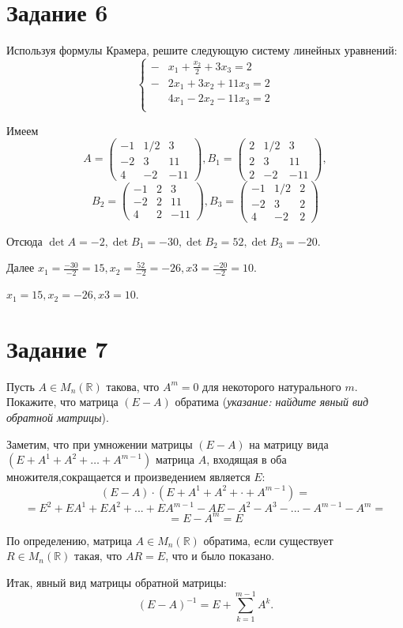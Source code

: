 \documentclass[a4paper,12pt]{article}
\begin{document}
\section*{Задание 6}
Используя формулы Крамера, решите следующую систему линейных уравнений:
\[
\left\{
\begin{aligned}
-&x_1 + \frac{x_2}{2} + 3 x_3 = 2\\
-&2x_1 + 3x_2 + 11x_3 = 2\\
&4x_1 -2x_2 -11x_3 = 2\\
\end{aligned}
\right.
\]
 \par
Имеем
$$A=
\begin{pmatrix}
-1 & {1}/2 & 3\\
-2 & 3 & 11\\
4 & -2 & -11
\end{pmatrix},
B_1=
\begin{pmatrix}
2 & {1}/2 & 3\\
2 & 3 & 11\\
2 & -2 & -11
\end{pmatrix},
$$
$$
B_2=
\begin{pmatrix}
-1 & 2 & 3\\
-2 & 2 & 11\\
4 & 2 & -11
\end{pmatrix},
B_3=
\begin{pmatrix}
-1 & {1}/2 & 2\\
-2 & 3 & 2\\
4 & -2 & 2
\end{pmatrix}
$$
\par
Отсюда $\det A = -2, \det B_1=-30, \det B_2=52, \det B_3=-20$.\par
Далее $x_1 = \frac{-30}{-2}=15,x_2=\frac{52}{-2}=-26,x3=\frac{-20}{-2}=10$. \par
{}$x_1 =15,x_2=-26,x3=10$.

\section*{Задание 7}

Пусть $A\in M_n(\mathbb{R})$ такова, что $A^m = 0$ для некоторого натурального $m$. Покажите, что матрица $(E - A)$ обратима ({\it указание: найдите явный вид обратной матрицы}).\par
{} \par

Заметим, что при умножении матрицы $(E - A)$ на матрицу вида\\$(E+A^1+A^2+\ldots+A^{m-1})$ матрица $A$, входящая в оба множителя,сокращается и произведением является $E$:
$$(E-A)\cdot(E+A^1+A^2+\cdot+A^{m-1})=$$
$$
=E^2+EA^1+EA^2+...+EA^{m-1}-AE-A^2-A^3-...-A^{m-1}-A^m=
$$
$$=E-A^m=E$$\par
По определению, матрица $A\in M_n(\mathbb{R})$ обратима, если существует\\$R\in M_n(\mathbb{R})$ такая, что $AR=E$, что и было показано.\par
Итак, явный вид матрицы обратной матрицы:
$$(E-A)^{-1}=E+\sum_{k=1}^{m-1}A^k.$$
\end{document}
